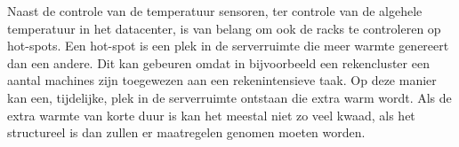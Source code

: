 Naast de controle van de temperatuur sensoren, ter controle van de algehele temperatuur in het datacenter, is van belang om ook de racks te controleren op hot-spots. Een hot-spot is een plek in de serverruimte die meer warmte genereert dan een andere. Dit kan gebeuren omdat in bijvoorbeeld een rekencluster een aantal machines zijn toegewezen aan een rekenintensieve taak. Op deze manier kan een, tijdelijke, plek in de serverruimte ontstaan die extra warm wordt. Als de extra warmte van korte duur is kan het meestal niet zo veel kwaad, als het structureel is dan zullen er maatregelen genomen moeten worden.


